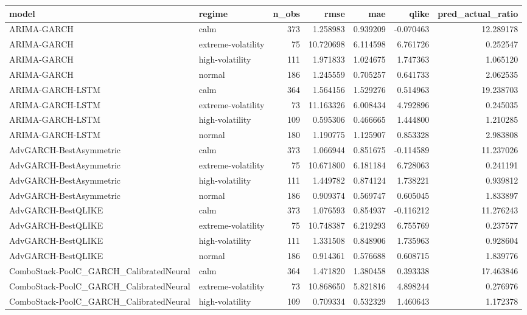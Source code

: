 \begin{tabular}{l l r r r r r}
\hline
model & regime & n\_obs & rmse & mae & qlike & pred\_actual\_ratio \\
\hline
ARIMA-GARCH & calm & 373 & 1.258983 & 0.939209 & -0.070463 & 12.289178 \\
ARIMA-GARCH & extreme-volatility & 75 & 10.720698 & 6.114598 & 6.761726 & 0.252547 \\
ARIMA-GARCH & high-volatility & 111 & 1.971833 & 1.024675 & 1.747363 & 1.065120 \\
ARIMA-GARCH & normal & 186 & 1.245559 & 0.705257 & 0.641733 & 2.062535 \\
ARIMA-GARCH-LSTM & calm & 364 & 1.564156 & 1.529276 & 0.514963 & 19.238703 \\
ARIMA-GARCH-LSTM & extreme-volatility & 73 & 11.163326 & 6.008434 & 4.792896 & 0.245035 \\
ARIMA-GARCH-LSTM & high-volatility & 109 & 0.595306 & 0.466665 & 1.444800 & 1.210285 \\
ARIMA-GARCH-LSTM & normal & 180 & 1.190775 & 1.125907 & 0.853328 & 2.983808 \\
AdvGARCH-BestAsymmetric & calm & 373 & 1.066944 & 0.851675 & -0.114589 & 11.237026 \\
AdvGARCH-BestAsymmetric & extreme-volatility & 75 & 10.671800 & 6.181184 & 6.728063 & 0.241191 \\
AdvGARCH-BestAsymmetric & high-volatility & 111 & 1.449782 & 0.874124 & 1.738221 & 0.939812 \\
AdvGARCH-BestAsymmetric & normal & 186 & 0.909374 & 0.569747 & 0.605045 & 1.833897 \\
AdvGARCH-BestQLIKE & calm & 373 & 1.076593 & 0.854937 & -0.116212 & 11.276243 \\
AdvGARCH-BestQLIKE & extreme-volatility & 75 & 10.748387 & 6.219293 & 6.755769 & 0.237577 \\
AdvGARCH-BestQLIKE & high-volatility & 111 & 1.331508 & 0.848906 & 1.735963 & 0.928604 \\
AdvGARCH-BestQLIKE & normal & 186 & 0.914361 & 0.576688 & 0.608715 & 1.839776 \\
ComboStack-PoolC\_GARCH\_CalibratedNeural & calm & 364 & 1.471820 & 1.380458 & 0.393338 & 17.463846 \\
ComboStack-PoolC\_GARCH\_CalibratedNeural & extreme-volatility & 73 & 10.868650 & 5.821816 & 4.898244 & 0.276976 \\
ComboStack-PoolC\_GARCH\_CalibratedNeural & high-volatility & 109 & 0.709334 & 0.532329 & 1.460643 & 1.172378 \\

\end{tabular}
